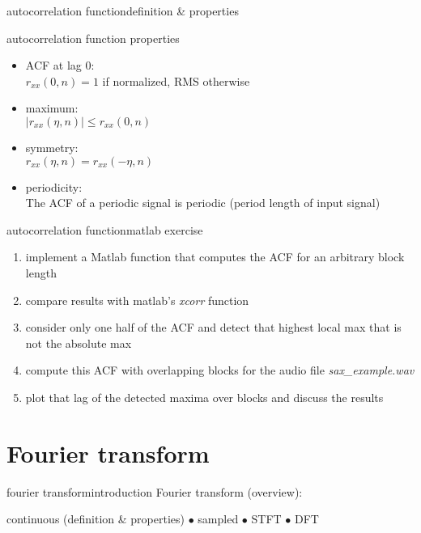         \begin{frame}{autocorrelation function}{definition \& properties}
            \begin{block}{autocorrelation function properties}
                \begin{itemize}
                    \item	{ACF} at lag $0$:\\
                    $r_{xx}(0,n) = 1$ if normalized, RMS otherwise
                
                    \item	maximum:\\
                    $|r_{xx}(\eta,n)| \leq r_{xx}(0,n)$ 
                    \item	symmetry:\\
                    $r_{xx}(\eta,n) = r_{xx}(-\eta,n)$
                    \item	periodicity:\\
                    The {ACF} of a periodic signal is periodic (period length of input signal)
                \end{itemize}	
            \end{block}
        \end{frame}	
        
        \begin{frame}{autocorrelation function}{matlab exercise}
            
            \begin{enumerate}
                \item   implement a Matlab function that computes the ACF for an arbitrary block length
                \item   compare results with matlab's \textsl{xcorr} function
                \item   consider only one half of the ACF and detect that highest local max that is not the absolute max
                \item   compute this ACF with overlapping blocks for the audio file \textsl{sax\_example.wav} 
                \item   plot that lag of the detected maxima over blocks and discuss the results
            \end{enumerate}
        \end{frame}
 
    \section[fourier transform]{Fourier transform}
        \begin{frame}{fourier transform}{introduction}
            Fourier transform (overview):
            
            continuous (definition \& properties) $\bullet$ sampled $\bullet$ STFT $\bullet$ DFT
            \vspace{30mm}
        \end{frame}	

